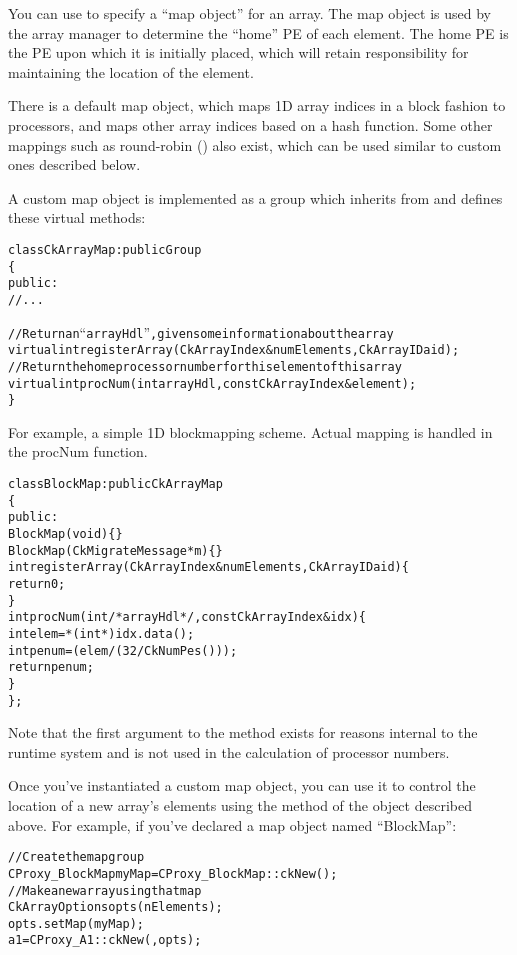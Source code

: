 You can use  to specify a ``map object'' for an
array.  The map object is used by the array manager to determine the
``home'' PE of each element.  The home PE is the PE upon which it is
initially placed, which will retain responsibility for maintaining the
location of the element.

There is a default map object, which maps 1D array indices
in a block fashion to processors, and maps other array
indices based on a hash function. Some other mappings such as round-robin
() also exist, which can be used
similar to custom ones described below.

A custom map object is implemented as a group which inherits from
 and defines these virtual methods:

\begin{alltt}
class CkArrayMap : public Group
\{
public:
  //...
  
  //Return an ``arrayHdl'', given some information about the array
  virtual int registerArray(CkArrayIndex& numElements,CkArrayID aid);
  //Return the home processor number for this element of this array
  virtual int procNum(int arrayHdl,const CkArrayIndex &element);
\}
\end{alltt}

For example, a simple 1D blockmapping scheme.  Actual mapping is
handled in the procNum function.

\begin{alltt}
class BlockMap : public CkArrayMap 
\{
 public:
  BlockMap(void) \{\}
  BlockMap(CkMigrateMessage *m)\{\}
  int registerArray(CkArrayIndex& numElements,CkArrayID aid) \{
    return 0;
  \}
  int procNum(int /*arrayHdl*/,const CkArrayIndex &idx) \{
    int elem=*(int *)idx.data();
    int penum =  (elem/(32/CkNumPes()));
    return penum;
  \}
\};

\end{alltt}

Note that the first argument to the  method exists for reasons
internal to the runtime system and is not used in the calculation of processor
numbers.

Once you've instantiated a custom map object, you can use it to
control the location of a new array's elements using the
 method of the  object described above.
For example, if you've declared a map object named ``BlockMap'':

\begin{alltt}
//Create the map group
  CProxy_BlockMap myMap=CProxy_BlockMap::ckNew();
//Make a new array using that map
  CkArrayOptions opts(nElements);
  opts.setMap(myMap);
  a1=CProxy_A1::ckNew(,opts);
\end{alltt}

